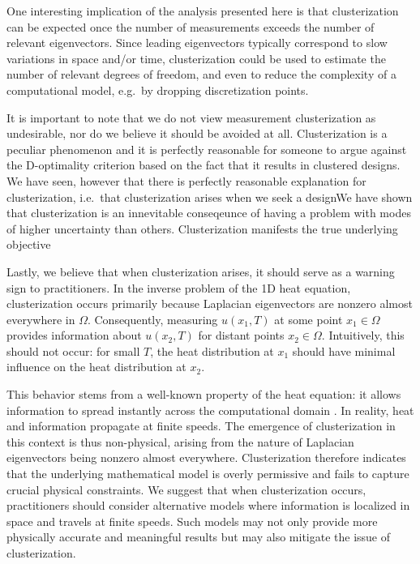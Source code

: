 One interesting implication of the analysis presented here is that
clusterization can be expected once the number of measurements exceeds
the number of relevant eigenvectors. Since leading eigenvectors
typically correspond to slow variations in space and/or time,
clusterization could be used to estimate the number of relevant
degrees of freedom, and even to reduce the complexity of a
computational model, e.g.~by dropping discretization points.

It is important to note that we do not view measurement clusterization
as undesirable, nor do we believe it should be avoided at
all. Clusterization is a peculiar phenomenon and it is perfectly
reasonable for someone to argue against the D-optimality criterion
based on the fact that it results in clustered designs. We have seen,
however that there is perfectly reasonable explanation for
clusterization, i.e.~that clusterization arises when we seek a
designWe have shown that clusterization is an innevitable conseqeunce
of having a problem with modes of higher uncertainty than
others. Clusterization manifests the true underlying objective

Lastly, we believe that when clusterization arises, it should serve as
a warning sign to practitioners. In the inverse problem of the 1D heat
equation, clusterization occurs primarily because Laplacian
eigenvectors are nonzero almost everywhere in $\Omega$. Consequently,
measuring $u(x_1, T)$ at some point $x_1 \in \Omega$ provides
information about $u(x_2,T)$ for distant points $x_2 \in
\Omega$. Intuitively, this should not occur: for small $T$, the heat
distribution at $x_1$ should have minimal influence on the heat
distribution at $x_2$.

This behavior stems from a well-known property of the heat equation:
it allows information to spread instantly across the computational
domain \cite{renardy2006PDE}. In reality, heat and information
propagate at finite speeds. The emergence of clusterization in this
context is thus non-physical, arising from the nature of Laplacian
eigenvectors being nonzero almost everywhere. Clusterization therefore
indicates that the underlying mathematical model is overly permissive
and fails to capture crucial physical constraints. We suggest that
when clusterization occurs, practitioners should consider alternative
models where information is localized in space and travels at finite
speeds. Such models may not only provide more physically accurate and
meaningful results but may also mitigate the issue of clusterization.



